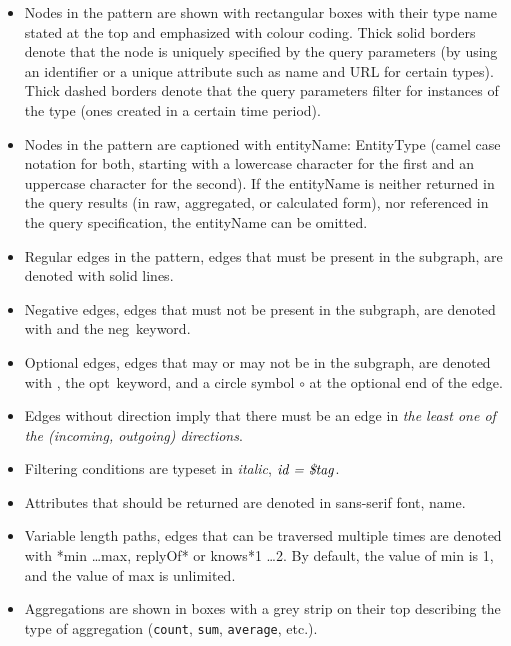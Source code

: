 \begin{itemize}
	\item Nodes in the pattern are shown with rectangular boxes with their type name stated at the top and emphasized with colour coding.
	Thick solid borders denote that the node is uniquely specified by the query parameters (\eg by using an identifier or a unique attribute such as \textsf{name} and \textsf{URL} for certain types). Thick dashed borders denote that the query parameters filter for instances of the type (\eg ones created in a certain time period).
	\item Nodes in the pattern are captioned with \textsf{entityName: EntityType} (camel case 
	notation for both, starting with a lowercase character for the first and an 
	uppercase character for the second). If the \textsf{entityName} is neither returned in the query results (in raw, aggregated, or calculated form), nor referenced in the query specification, the \textsf{entityName} can be omitted.
	\item Regular edges in the pattern, \ie edges that must be present in the subgraph, are denoted with solid lines.
	\item Negative edges, \ie edges that must not be present in the subgraph, are denoted with \textcolor{red}{} and the \guillemotleft neg\guillemotright\ keyword.
	\item Optional edges, \ie edges that may or may not be in the subgraph, are denoted with , the \guillemotleft opt\guillemotright\ keyword, and a circle symbol $\circ$ at the optional end of the edge.
	\item Edges without direction imply that there must be an edge in \emph{the least one of the (incoming, outgoing) directions}.
	\item Filtering conditions are typeset in \textit{italic}, \eg $\textit{id = 
	\textdollar tag}$.
	\item Attributes that should be returned are denoted in sans-serif font, \eg \textsf{name}.
	\item Variable length paths, \ie edges that can be traversed multiple times 
	are denoted with \textsf{*min \ldots max}, \eg \textsf{replyOf*} or 
	\textsf{knows*1 \ldots 2}. By default, the value of \textsf{min} is 1, 
	and the value of \textsf{max} is unlimited.
	\item Aggregations are shown in boxes with a grey strip on their top describing the type of aggregation (\lstinline{count}, \lstinline{sum}, \lstinline{average}, etc.).
\end{itemize}

